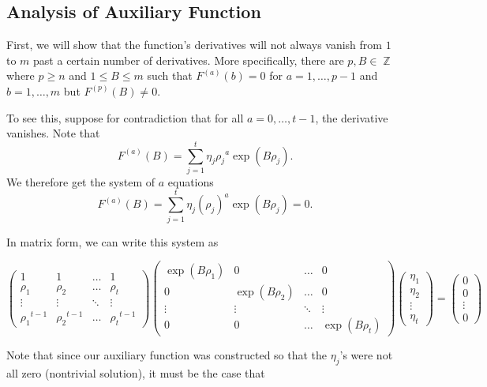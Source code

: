 \documentclass[a4paper, 11pt]{book}
\DeclareMathOperator{\Z}{\mathbb{Z}}
\begin{document}
\subsection{Analysis of Auxiliary Function}
First, we will show that the function's derivatives will not always vanish from $1$ to $m$ past a certain number of derivatives. More specifically, there are $p, B \in \Z$ where $p \geq n$ and $1 \leq B \leq m$ such that $F^{(a)}(b) = 0$ for $a = 1, \ldots, p-1$ and $b = 1, \ldots, m$ but $F^{(p)}(B) \neq 0$.\par

To see this, suppose for contradiction that for all $a = 0, \ldots, t-1$, the derivative vanishes. Note that \[F^{(a)}(B) = \sum\limits_{j=1}^{t} \eta_{j}{\rho_{j}}^{a}\exp(B\rho_j).\] We therefore get the system of $a$ equations \[F^{(a)}(B) = \sum\limits_{j = 1}^{t} \eta_{j}{\left(\rho_j\right)}^{a}\exp(B\rho_j) = 0.\]

In matrix form, we can write this system as 

\[
    \begin{pmatrix}
        1 & 1 & \hdots & 1 \\
        \rho_{1} & \rho_{2} & \hdots & {\rho_t} \\ 
        \vdots & \vdots & \ddots & \vdots \\
        {\rho_{1}}^{t-1} & {\rho_{2}}^{t-1} & \hdots & {\rho_t}^{t-1}
    \end{pmatrix} 
    \begin{pmatrix}
        \exp(B\rho_1) & 0 & \hdots & 0 \\
        0 & \exp(B\rho_2) & \hdots & 0 \\
        \vdots & \vdots & \ddots & \vdots \\
        0 & 0 & \hdots & \exp(B\rho_t) 
    \end{pmatrix} 
    \begin{pmatrix}
        \eta_1 \\ \eta_2 \\ \vdots \\ \eta_t
    \end{pmatrix} = 
    \begin{pmatrix}
        0 \\ 0 \\ \vdots \\ 0
    \end{pmatrix} 
\]

Note that since our auxiliary function was constructed so that the $\eta_j$'s were not all zero (nontrivial solution), it must be the case that 
\end{document}
